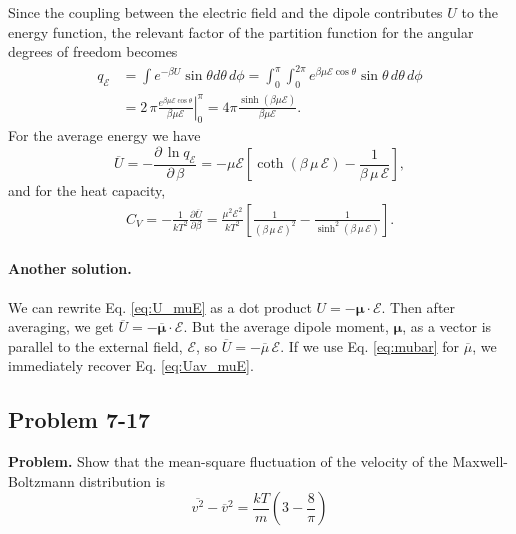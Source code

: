 \documentclass[twocolumn, 10pt]{article}
\numberwithin{equation}{section}
\newenvironment{problem}
{\par\medskip\sffamily \color{problue}
  \textbf{Problem. }\ignorespaces}
{\medskip}
\newenvironment{solution}[1][\empty]
{\par\medskip
  \textbf{\ifx\empty#1{Solution.}\relax\else{#1}\fi} \ignorespaces}
{\medskip}
\begin{document}
\begin{solution}
Since the coupling between the electric field
and the dipole contributes $U$
to the energy function,
the relevant factor of the partition function
for the angular degrees of freedom becomes
\begin{align*}
  q_{\mathscr E}
  &=
  \int e^{-\beta U} \sin\theta d\theta \, d\phi
  =
  \int_0^\pi \int_0^{2\pi}
  e^{\beta \mu \mathscr E \cos\theta}
  \sin\theta \, d\theta \, d\phi
  \\
  &=
  2 \, \pi \left. \frac{
    e^{\beta \mu \mathscr E \cos\theta }
  } { \beta \mu \mathscr E}
  \right|_{0}^\pi
  =
  4 \pi \frac{ \sinh(\beta\mu\mathscr E) }
  {\beta \mu \mathscr E}
  .
\end{align*}
For the average energy we have
\begin{equation}
  \overline U
  =
  - \frac{ \partial \, \ln q_{\mathscr E} }
         { \partial \, \beta }
  =
  -\mu \mathscr E
  \left[
    \coth(\beta \, \mu \, \mathscr E)
    -
    \frac{1}{\beta \, \mu \, \mathscr E}
  \right]
  ,
  \label{eq:Uav_muE}
\end{equation}
and for the heat capacity,
  \begin{align*}
  C_V
  =-\frac{ 1 } { k T^2 }
    \frac{ \partial \overline U }
    {\partial \beta }
  =
  \frac{ \mu^2 \mathscr E^2 } { kT^2 }
  \left[
    \frac{1}{(\beta \, \mu \, \mathscr E)^2}
    -
    \frac{1}{\sinh^2(\beta \, \mu \, \mathscr E)}
  \right].
  \end{align*}

\paragraph*{Another solution.}

We can rewrite Eq. \eqref{eq:U_muE} as
a dot product
$U = -\pmb\mu \cdot \mathscr E$.
%
Then after averaging, we get
$\overline U = -\overline{ \pmb\mu} \cdot \mathscr E$.
%
But the average dipole moment, $\pmb\mu$, as a vector
is parallel to the external field, $\mathscr E$,
so
$\overline U = -\overline{ \mu} \, \mathscr E$.
If we use Eq. \eqref{eq:mubar} for $\overline\mu$,
we immediately recover Eq. \eqref{eq:Uav_muE}.
\end{solution}


\subsection{Problem 7-17}

\begin{problem}
  Show that the mean-square fluctuation of
  the velocity of the Maxwell-Boltzmann distribution
  is
  $$
  \overline{ v^2 } - \overline{v}^2
  =
  \frac{ k T } { m }
  \left(3 - \frac{8}{\pi} \right)
  $$
\end{problem}
\end{document}
